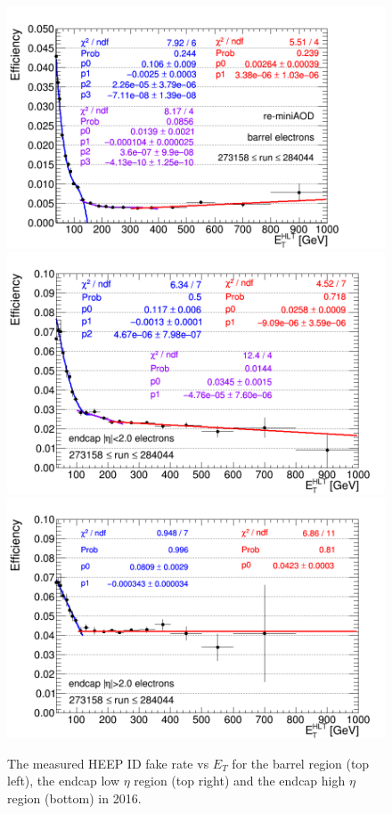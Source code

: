 \begin{figure}[b]
  \begin{center}
\includegraphics[width=0.47\linewidth,angle=0]{figures/Zprime/2016/fakeRates/frEBGSFixed.png}
\includegraphics[width=0.47\linewidth,angle=0]{figures/Zprime/2016/fakeRates/frEELowVsEt.png}
\includegraphics[width=0.47\linewidth,angle=0]{figures/Zprime/2016/fakeRates/frEEHighVsEt.png}
    \caption{The measured HEEP ID fake rate vs $E_T$ for the barrel region (top left), the endcap low $\eta$ region (top right) and the endcap high $\eta$ region (bottom) in 2016.}
       \label{fr:fig:heepFRV70VsEt_2016}
  \end{center}
\end{figure}

